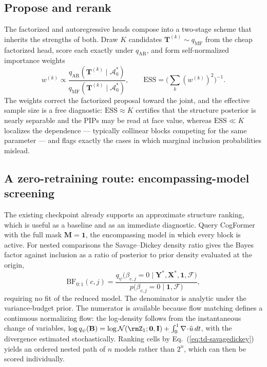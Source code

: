 \documentclass[11pt]{article}
\newcommand{\rmB}{\mathbf{B}}
\newcommand{\rmX}{\mathbf{X}}
\newcommand{\rmM}{\mathbf{M}}
\newcommand{\rmY}{\mathbf{Y}}
\newcommand{\rmT}{\mathbf{T}}
\providecommand{\cref}[1]{Eq.~(\ref{#1})}
\begin{document}
\subsection{Propose and rerank}

The factorized and autoregressive heads compose into a two-stage scheme that inherits
the strengths of both. Draw $K$ candidates $\rmT^{(k)} \sim q_{\mathrm{MF}}$ from the
cheap factorized head, score each exactly under $q_{\mathrm{AR}}$, and form
self-normalized importance weights
%
\begin{equation}
\label{eq:td-snis}
w^{(k)} \propto \frac{q_{\mathrm{AR}}(\rmT^{(k)} \mid \mathcal{A}_0^\ast)}
                     {q_{\mathrm{MF}}(\rmT^{(k)} \mid \mathcal{A}_0^\ast)},
\qquad
\mathrm{ESS} = \Big(\textstyle\sum_k (w^{(k)})^2\Big)^{-1} .
\end{equation}
%
The weights correct the factorized proposal toward the joint, and the effective sample
size is a free diagnostic: $\mathrm{ESS} \approx K$ certifies that the structure
posterior is nearly separable and the PIPs may be read at face value, whereas
$\mathrm{ESS} \ll K$ localizes the dependence --- typically collinear blocks competing
for the same parameter --- and flags exactly the cases in which marginal inclusion
probabilities mislead.

\subsection{A zero-retraining route: encompassing-model screening}

The existing checkpoint already supports an approximate structure ranking, which is
useful as a baseline and as an immediate diagnostic. Query CogFormer with the full mask
$\rmM = \bm{1}$, the encompassing model in which every block is active. For nested
comparisons the Savage--Dickey density ratio gives the Bayes factor against inclusion
as a ratio of posterior to prior density evaluated at the origin,
%
\begin{equation}
\label{eq:td-savagedickey}
\mathrm{BF}_{0:1}(c,j)
= \frac{q_\psi\big(\beta_{c,j} = 0 \mid \rmY^\ast, \rmX^\ast, \bm{1}, \mathcal{F}\big)}
       {p\big(\beta_{c,j} = 0 \mid \bm{1}, \mathcal{F}\big)} ,
\end{equation}
%
requiring no fit of the reduced model. The denominator is analytic under the
variance-budget prior. The numerator is available because flow matching defines a
continuous normalizing flow: the log-density follows from the instantaneous change of
variables, $\log q_\psi(\rmB) = \log \mathcal{N}(\rmZ_1; \bm{0}, \mathbf{I}) + \int_0^1 \nabla \!\cdot\! \hat{u}\, dt$,
with the divergence estimated stochastically. Ranking cells by
\cref{eq:td-savagedickey} yields an ordered nested path of $n$ models rather than
$2^{n}$, which can then be scored individually.
\end{document}

